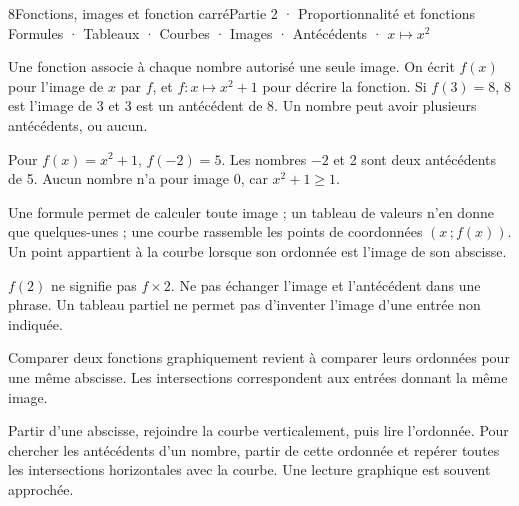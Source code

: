 \begin{ouverture}[courbe]{8}{Fonctions, images et fonction carré}{Partie 2 · Proportionnalité et fonctions}
{Formules · Tableaux · Courbes · Images · Antécédents · $x\mapsto x^2$}
\end{ouverture}
\pagestyle{otMain}\essentiel\fontsize{11}{15}\selectfont
{}
\begin{definition}Une fonction associe à chaque nombre autorisé une seule image. On écrit $f(x)$ pour l’image de $x$ par $f$, et $f:x\mapsto x^2+1$ pour décrire la fonction. Si $f(3)=8$, 8 est l’image de 3 et 3 est un antécédent de 8. Un nombre peut avoir plusieurs antécédents, ou aucun.\end{definition}
\begin{exemple}Pour $f(x)=x^2+1$, $f(-2)=5$. Les nombres $-2$ et 2 sont deux antécédents de 5. Aucun nombre n’a pour image 0, car $x^2+1\ge1$.\end{exemple}
\begin{savoirfaire}Une formule permet de calculer toute image ; un tableau de valeurs n’en donne que quelques-unes ; une courbe rassemble les points de coordonnées $(x\,;f(x))$. Un point appartient à la courbe lorsque son ordonnée est l’image de son abscisse.\end{savoirfaire}
\begin{attention}$f(2)$ ne signifie pas $f\times2$. Ne pas échanger l’image et l’antécédent dans une phrase. Un tableau partiel ne permet pas d’inventer l’image d’une entrée non indiquée.\end{attention}
\begin{propriete}Comparer deux fonctions graphiquement revient à comparer leurs ordonnées pour une même abscisse. Les intersections correspondent aux entrées donnant la même image.\end{propriete}
\clearpage
{}
\begin{savoirfaire}Partir d’une abscisse, rejoindre la courbe verticalement, puis lire l’ordonnée. Pour chercher les antécédents d’un nombre, partir de cette ordonnée et repérer toutes les intersections horizontales avec la courbe. Une lecture graphique est souvent approchée.\end{savoirfaire}
